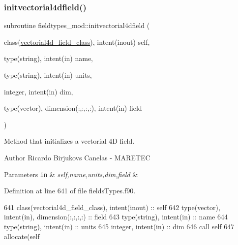 \subsubsection{\texorpdfstring{initvectorial4dfield()}{initvectorial4dfield()}}
{\footnotesize\ttfamily subroutine fieldtypes\+\_\+mod\+::initvectorial4dfield (\begin{DoxyParamCaption}\item[{class(\mbox{\hyperlink{structfieldtypes__mod_1_1vectorial4d__field__class}{vectorial4d\+\_\+field\+\_\+class}}), intent(inout)}]{self,  }\item[{type(string), intent(in)}]{name,  }\item[{type(string), intent(in)}]{units,  }\item[{integer, intent(in)}]{dim,  }\item[{type(vector), dimension(\+:,\+:,\+:,\+:), intent(in)}]{field }\end{DoxyParamCaption})\hspace{0.3cm}{\ttfamily [private]}}



Method that initializes a vectorial 4D field. 

\begin{DoxyAuthor}{Author}
Ricardo Birjukovs Canelas -\/ M\+A\+R\+E\+T\+EC 
\end{DoxyAuthor}

\begin{DoxyParams}[1]{Parameters}
\mbox{\tt in}  & {\em self,name,units,dim,field} & \\
\hline
\end{DoxyParams}


Definition at line 641 of file fields\+Types.\+f90.


\begin{DoxyCode}
641     \textcolor{keywordtype}{class}(vectorial4d\_field\_class), \textcolor{keywordtype}{intent(inout)} :: self
642     \textcolor{keywordtype}{type}(vector), \textcolor{keywordtype}{intent(in)}, \textcolor{keywordtype}{dimension(:,:,:,:)} :: field
643     \textcolor{keywordtype}{type}(string), \textcolor{keywordtype}{intent(in)} :: name
644     \textcolor{keywordtype}{type}(string), \textcolor{keywordtype}{intent(in)} :: units
645     \textcolor{keywordtype}{integer}, \textcolor{keywordtype}{intent(in)} :: dim
646     \textcolor{keyword}{call }self%
647     \textcolor{keyword}{allocate}(self%
\end{DoxyCode}
\mbox{\label{namespacefieldtypes__mod_a5a556fba603c1d39b20713fdbc813332}} 
